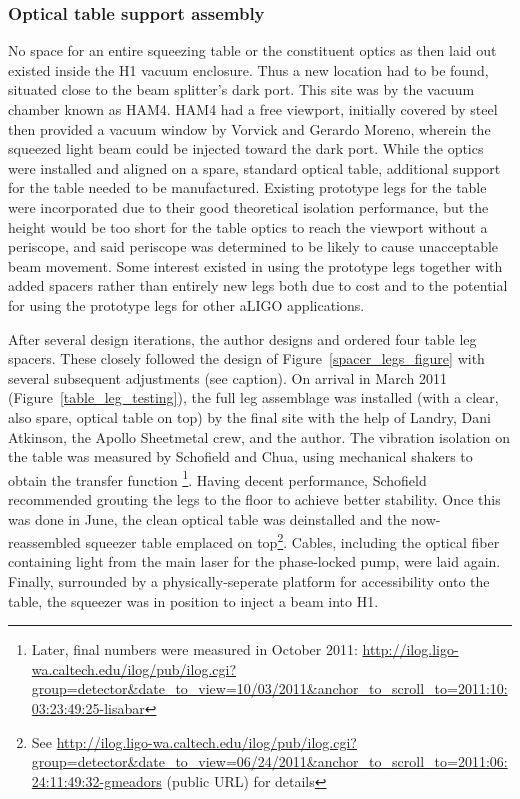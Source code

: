 
            \subsubsection{Optical table support assembly}
            \label{table_legs}

No space for an entire squeezing table or the constituent optics as then laid out existed inside the H1 vacuum enclosure.
Thus a new location had to be found, situated close to the beam splitter's dark port.
This site was by the vacuum chamber known as HAM4.
HAM4 had a free viewport, initially covered by steel then provided a vacuum window by Vorvick and Gerardo Moreno, wherein the squeezed light beam could be injected toward the dark port.
While the optics were installed and aligned on a spare, standard optical table, additional support for the table needed to be manufactured.
Existing prototype legs for the table were incorporated due to their good theoretical isolation performance, but the height would be too short for the table optics to reach the viewport without a periscope, and said periscope was determined to be likely to cause unacceptable beam movement. 
Some interest existed in using the prototype legs together with added spacers rather than entirely new legs both due to cost and to the potential for using the prototype legs for other aLIGO applications.

After several design iterations, the author designs and ordered four table leg spacers. These closely followed the design of Figure~\ref{spacer_legs_figure} with several subsequent adjustments (see caption).
On arrival in March 2011 (Figure~\ref{table_leg_testing}), the full leg assemblage was installed (with a clear, also spare, optical table on top) by the final site with the help of Landry, Dani Atkinson, the Apollo Sheetmetal crew, and the author.
The vibration isolation on the table was measured by Schofield and Chua, using mechanical shakers to obtain the transfer function \footnote{Later, final numbers were measured in October 2011: \url{http://ilog.ligo-wa.caltech.edu/ilog/pub/ilog.cgi?group=detector&date_to_view=10/03/2011&anchor_to_scroll_to=2011:10:03:23:49:25-lisabar}}.
Having decent performance, Schofield recommended grouting the legs to the floor to achieve better stability.
Once this was done in June, the clean optical table was deinstalled and the now-reassembled squeezer table emplaced on top\footnote{See \url{http://ilog.ligo-wa.caltech.edu/ilog/pub/ilog.cgi?group=detector&date_to_view=06/24/2011&anchor_to_scroll_to=2011:06:24:11:49:32-gmeadors} (public URL) for details}.
Cables, including the optical fiber containing light from the main laser for the phase-locked pump, were laid again.
Finally, surrounded by a physically-seperate platform for accessibility onto the table, the squeezer was in position to inject a beam into H1.


